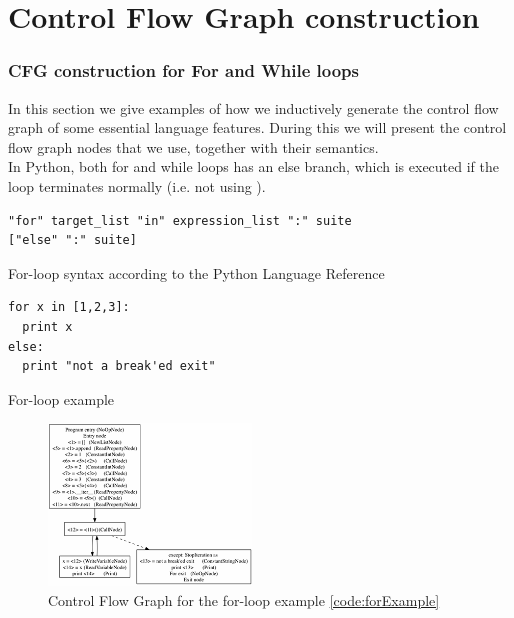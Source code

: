 \chapter{Control Flow Graph construction}

\subsection{CFG construction for For and While loops}
In this section we give examples of how we inductively generate the control flow graph of some essential language features. During this we will present the control flow graph nodes that we use, together with their semantics. \\
In Python, both for and while loops has an else branch, which is executed if the loop terminates normally (i.e. not using ).

\begin{listing}[H]
	\begin{verbatim}
"for" target_list "in" expression_list ":" suite 
["else" ":" suite]
	\end{verbatim}
	\caption{For-loop syntax according to the Python Language Reference}\label{code:forSyntax}
\end{listing}

\begin{listing}[H]
	\begin{verbatim}
for x in [1,2,3]:
  print x
else:
  print "not a break'ed exit"
	\end{verbatim}
	\caption{For-loop example}\label{code:forExample}
\end{listing}

\begin{figure}
	\vspace{-20pt}
	\begin{center}
		\includegraphics[width=0.48\textwidth]{images/for-example-cfg.png}
	\end{center}
	\vspace{-10pt}
	\caption{Control Flow Graph for the for-loop example \ref{code:forExample}}
	\label{fig:forCfg}
	\vspace{-10pt}
\end{figure}


